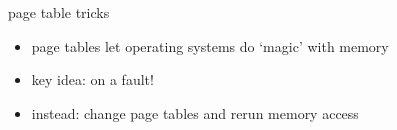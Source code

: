 \begin{frame}{page table tricks}
\begin{itemize}
\item page tables let operating systems do `magic' with memory
\item key idea:  on a fault!
\vspace{.5cm}
\item instead: change page tables and rerun memory access
\end{itemize}
\end{frame}
